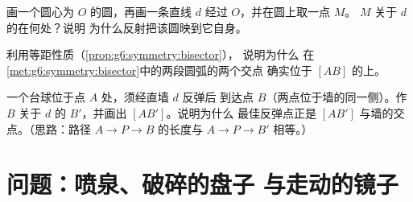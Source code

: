 \begin{exercise}[$\star\star$]\label{exo:g6:symmetry:10}
画一个圆心为 $O$ 的圆，再画一条直线 $d$ 经过 $O$，并在圆上取一点 $M$。
$M$ 关于 $d$ 的在何处？说明
为什么反射把该圆映到它自身。
\end{exercise}

\begin{exercise}[$\star\star$]\label{exo:g6:symmetry:11}
利用等距性质（\cref{prop:g6:symmetry:bisector}），
说明为什么
在\cref{met:g6:symmetry:bisector}中的两段圆弧的两个交点
确实位于 $[AB]$ 的上。
\end{exercise}

\begin{exercise}[$\star\star\star$]\label{exo:g6:symmetry:12}
一个台球位于点 $A$ 处，须经直墙 $d$ 反弹后
到达点 $B$（两点位于墙的同一侧）。作 $B$
关于 $d$ 的 $B'$，并画出 $[AB']$。说明为什么
最佳反弹点正是 $[AB']$ 与墙的交点。（思路：路径
$A \to P \to B$ 的长度与 $A \to P \to B'$ 相等。）
\end{exercise}

\section{问题：喷泉、破碎的盘子
与走动的镜子}


